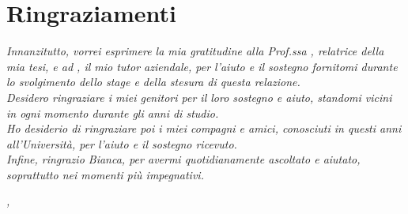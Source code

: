 
\cleardoublepage
{}
{}



\bigskip

\begingroup
\let\clearpage\relax
\let\cleardoublepage\relax
\let\cleardoublepage\relax

\chapter*{Ringraziamenti}

\noindent \textit{Innanzitutto, vorrei esprimere la mia gratitudine alla Prof.ssa \myProf{}, relatrice della mia tesi, e ad \myTutor{}, il mio tutor aziendale, per l'aiuto e il sostegno fornitomi durante lo svolgimento dello stage e della stesura di questa relazione.}\\

\noindent \textit{Desidero ringraziare i miei genitori per il loro sostegno e aiuto, standomi vicini in ogni momento durante gli anni di studio.}\\

\noindent \textit{Ho desiderio di ringraziare poi i miei compagni e amici, conosciuti in questi anni all'Università, per l'aiuto e il sostegno ricevuto.}\\

\noindent \textit{Infine, ringrazio Bianca, per avermi quotidianamente ascoltato e aiutato, soprattutto nei momenti più impegnativi.}\\
\bigskip

\noindent\textit{\myLocation, \myTime}
\hfill \myName

\endgroup

